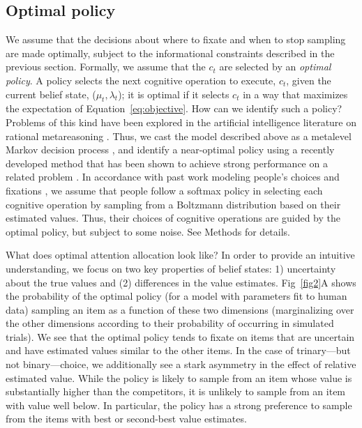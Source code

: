 \subsection{Optimal policy}

We assume that the decisions about where to fixate and when to stop sampling are made optimally, subject to the informational constraints described in the previous section. Formally, we assume that the $c_t$ are selected by an \emph{optimal policy}. A policy selects the next cognitive operation to execute, $c_t$, given the current belief state, ($\mu_t, \lambda_t$); it is optimal if it selects $c_t$ in a way that maximizes the expectation of Equation~\ref{eq:objective}. How can we identify such a policy? Problems of this kind have been explored in the artificial intelligence literature on rational metareasoning \citep{matheson1968economic,russell1991principles}. Thus, we cast the model described above as a metalevel Markov decision process \citep{hay2012selecting}, and identify a near-optimal policy using a recently developed method that has been shown to achieve strong performance on a related problem \citep{callaway2018learning}. In accordance with past work modeling people's choices \citep{mcfadden2001economic} and fixations \citep{gluth2020valuebased,song2019proactive}, we assume that people follow a softmax policy in selecting each cognitive operation by sampling from a Boltzmann distribution based on their estimated values. Thus, their choices of cognitive operations are guided by the optimal policy, but subject to some noise.  See Methods for details.

What does optimal attention allocation look like? In order to provide an intuitive understanding, we focus on two key properties of belief states: 1) uncertainty about the true values and (2) differences in the value estimates. Fig~\ref{fig2}A shows the probability of the optimal policy (for a model with parameters fit to human data) sampling an item as a function of these two dimensions (marginalizing over the other dimensions according to their probability of occurring in simulated trials).
We see that the optimal policy tends to fixate on items that are uncertain and have estimated values similar to the other items.
In the case of trinary---but not binary---choice, we additionally see a stark asymmetry in the effect of relative estimated value. While the policy is likely to sample from an item whose value is substantially higher than the competitors, it is unlikely to sample from an item with value well below. In particular, the policy has a strong preference to sample from the items with best or second-best value estimates.

